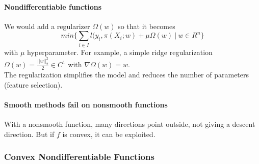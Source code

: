 \documentclass[10pt]{report}
\begin{document}
\paragraph{Nondifferentiable functions} We would add a regularizer $\Omega(w)$ so that it becomes $$min\{\sum_{i\in I} l(y_i, \pi(X_i;w)+\mu\Omega(w)\:|\:w\in R^n\}$$ with $\mu$ hyperparameter. For example, a simple ridge regularization $\Omega(w) = \frac{||w||_2^2}{2}\in C^1$ with $\nabla\Omega(w) = w$.\\
The regularization simplifies the model and reduces the number of parameters (feature selection).
\paragraph{Smooth methods fail on nonsmooth functions} With a nonsmooth function, many directions point outside, not giving a descent direction. But if $f$ is convex, it can be exploited.
\subsubsection{Convex Nondifferentiable Functions}\
\end{document}
